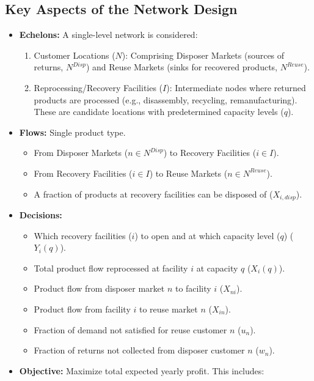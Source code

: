 \subsection*{Key Aspects of the Network Design}
\begin{itemize}
    \item \textbf{Echelons:} A single-level network is considered:
        \begin{enumerate}
            \item Customer Locations ($N$): Comprising Disposer Markets (sources of returns, $N^{Disp}$) and Reuse Markets (sinks for recovered products, $N^{Reuse}$).
            \item Reprocessing/Recovery Facilities ($I$): Intermediate nodes where returned products are processed (e.g., disassembly, recycling, remanufacturing). These are candidate locations with predetermined capacity levels ($q$).
        \end{enumerate}
    \item \textbf{Flows:} Single product type.
        \begin{itemize}
            \item From Disposer Markets ($n \in N^{Disp}$) to Recovery Facilities ($i \in I$).
            \item From Recovery Facilities ($i \in I$) to Reuse Markets ($n \in N^{Reuse}$).
            \item A fraction of products at recovery facilities can be disposed of ($X_{i,disp}$).
        \end{itemize}
    \item \textbf{Decisions:}
        \begin{itemize}
            \item Which recovery facilities ($i$) to open and at which capacity level ($q$) ($Y_i(q)$).
            \item Total product flow reprocessed at facility $i$ at capacity $q$ ($X_i(q)$).
            \item Product flow from disposer market $n$ to facility $i$ ($X_{ni}$).
            \item Product flow from facility $i$ to reuse market $n$ ($X_{in}$).
            \item Fraction of demand not satisfied for reuse customer $n$ ($u_n$).
            \item Fraction of returns not collected from disposer customer $n$ ($w_n$).
        \end{itemize}
    \item \textbf{Objective:} Maximize total expected yearly profit. This includes:

\end{itemize}
